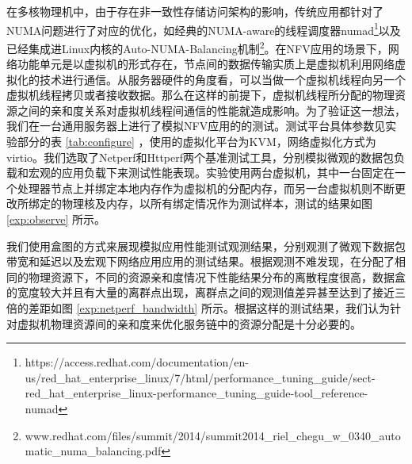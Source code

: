 在多核物理机中，由于存在非一致性存储访问架构的影响，传统应用都针对了NUMA问题进行了对应的优化，如经典的NUMA-aware的线程调度器numad\footnote{https://access.redhat.com/documentation/en-us/red\_hat\_enterprise\_linux/7/html/performance\_tuning\_guide/sect-red\_hat\_enterprise\_linux-performance\_tuning\_guide-tool\_reference-numad}以及已经集成进Linux内核的Auto-NUMA-Balancing机制\footnote{www.redhat.com/files/summit/2014/summit2014\_riel\_chegu\_w\_0340\_automatic\_numa\_balancing.pdf}。在NFV应用的场景下，网络功能单元是以虚拟机的形式存在，节点间的数据传输实质上是虚拟机利用网络虚拟化的技术进行通信。从服务器硬件的角度看，可以当做一个虚拟机线程向另一个虚拟机线程拷贝或者接收数据。那么在这样的前提下，虚拟机线程所分配的物理资源之间的亲和度关系对虚拟机线程间通信的性能就造成影响。为了验证这一想法，我们在一台通用服务器上进行了模拟NFV应用的的测试。测试平台具体参数见实验部分的表 \ref{tab:configure} ，使用的虚拟化平台为KVM，网络虚拟化方式为virtio。我们选取了Netperf和Httperf两个基准测试工具，分别模拟微观的数据包负载和宏观的应用负载下来测试性能表现。实验使用两台虚拟机，其中一台固定在一个处理器节点上并绑定本地内存作为虚拟机的分配内存，而另一台虚拟机则不断更改所绑定的物理核及内存，以所有绑定情况作为测试样本，测试的结果如图
 \ref{exp:observe} 所示。

我们使用盒图的方式来展现模拟应用性能测试观测结果，分别观测了微观下数据包带宽和延迟以及宏观下网络应用应用的测试结果。根据观测不难发现，在分配了相同的物理资源下，不同的资源亲和度情况下性能结果分布的离散程度很高，数据盒的宽度较大并且有大量的离群点出现，离群点之间的观测值差异甚至达到了接近三倍的差距如图 \ref{exp:netperf_bandwidth} 所示。根据这样的测试结果，我们认为针对虚拟机物理资源间的亲和度来优化服务链中的资源分配是十分必要的。

